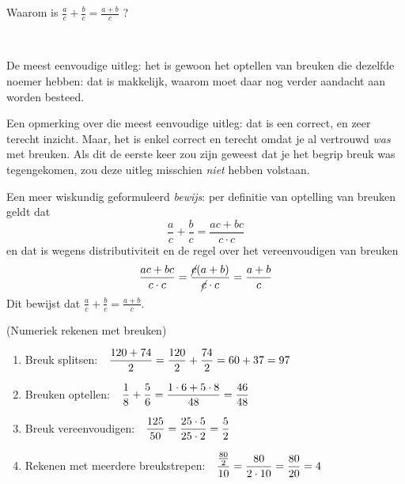 \documentclass[numbers]{ximera}
\begin{document}
\begin{expandable}
\begin{uitweiding}
\begin{example}
	Waarom is $\frac{a}{c}+\frac{b}{c} = \frac{a+b}{c}$ ?
	\begin{explanation} \ 
		
		De meest eenvoudige uitleg: het is gewoon het optellen van breuken die dezelfde noemer hebben: dat is makkelijk, waarom moet daar nog verder aandacht aan worden besteed.
		
		Een opmerking over die meest eenvoudige uitleg: dat is een correct, en zeer terecht inzicht. Maar, het is enkel correct en terecht omdat je al vertrouwd \textit{was} met breuken. Als dit de eerste keer zou zijn geweest dat je het begrip breuk was tegengekomen, zou deze uitleg misschien \textit{niet} hebben volstaan.		
		
		Een meer wiskundig geformuleerd \textit{bewijs}: per definitie van optelling van breuken geldt dat 
		$$ \frac{a}{c}+\frac{b}{c} = \frac{ac+bc}{c\cdot c}$$
		en dat is wegens distributiviteit en de regel over het vereenvoudigen van breuken
		$$ \frac{ac+bc}{c\cdot c} = \frac{\cancel{c}(a+b)}{\cancel{c} \cdot c} = \frac{a+b}{c}$$
		Dit bewijst dat $\frac{a}{c}+\frac{b}{c} = \frac{a+b}{c}$.
	\end{explanation}
	
\end{example}
\end{uitweiding}
\end{expandable}


\begin{example} (Numeriek rekenen met breuken)
	
	\begin{enumerate}
		\item Breuk splitsen:\ \ $\displaystyle{\frac{120+74}{2}=\frac{120}{2}+\frac{74}{2}=60+37=97}$
		\item Breuken optellen:\ \ $\displaystyle{\frac{1}{8}+\frac{5}{6}=\frac{1 \cdot 6+5 \cdot 8}{48}=\frac{46}{48}}$
		\item Breuk vereenvoudigen:\ \ $\displaystyle{\frac{125}{50}=\frac{25 \cdot 5}{25 \cdot 2}=\frac{5}{2}}$
		\item Rekenen met meerdere breukstrepen:\ \ $\displaystyle{\frac{\frac{80}{2}}{10}=\frac{80}{2\cdot10}=\frac{80}{20}=4}$
	\end{enumerate}
\end{example}
\end{document}
